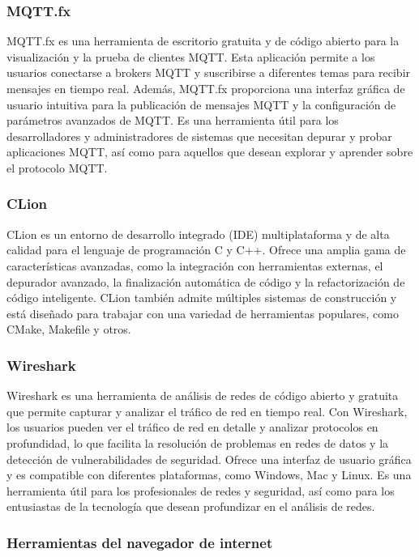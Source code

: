 \subsubsection{MQTT.fx}

MQTT.fx es una herramienta de escritorio gratuita y de código abierto para la visualización y la prueba de clientes MQTT. Esta aplicación permite a los usuarios conectarse a brokers MQTT y suscribirse a diferentes temas para recibir mensajes en tiempo real. Además, MQTT.fx proporciona una interfaz gráfica de usuario intuitiva para la publicación de mensajes MQTT y la configuración de parámetros avanzados de MQTT. Es una herramienta útil para los desarrolladores y administradores de sistemas que necesitan depurar y probar aplicaciones MQTT, así como para aquellos que desean explorar y aprender sobre el protocolo MQTT.


\subsubsection{CLion}

CLion es un entorno de desarrollo integrado (IDE) multiplataforma y de alta calidad para el lenguaje de programación C y C++. Ofrece una amplia gama de características avanzadas, como la integración con herramientas externas, el depurador avanzado, la finalización automática de código y la refactorización de código inteligente. CLion también admite múltiples sistemas de construcción y está diseñado para trabajar con una variedad de herramientas populares, como CMake, Makefile y otros.


\subsubsection{Wireshark}

Wireshark es una herramienta de análisis de redes de código abierto y gratuita que permite capturar y analizar el tráfico de red en tiempo real. Con Wireshark, los usuarios pueden ver el tráfico de red en detalle y analizar protocolos en profundidad, lo que facilita la resolución de problemas en redes de datos y la detección de vulnerabilidades de seguridad. Ofrece una interfaz de usuario gráfica y es compatible con diferentes plataformas, como Windows, Mac y Linux. Es una herramienta útil para los profesionales de redes y seguridad, así como para los entusiastas de la tecnología que desean profundizar en el análisis de redes.


\subsubsection{Herramientas del navegador de internet}

